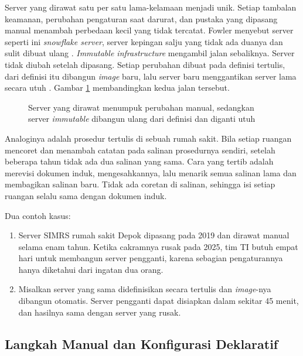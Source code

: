 Server yang dirawat satu per satu lama-kelamaan menjadi unik. Setiap tambalan keamanan,
perubahan pengaturan saat darurat, dan pustaka yang dipasang manual menambah perbedaan kecil
yang tidak tercatat. Fowler menyebut server seperti ini \textit{snowflake server}, server
kepingan salju yang tidak ada duanya dan sulit dibuat ulang \cite{c05-fowler-snowflake}.
\textit{Immutable infrastructure} mengambil jalan sebaliknya. Server tidak diubah setelah
dipasang. Setiap perubahan dibuat pada definisi tertulis, dari definisi itu dibangun
\textit{image} baru, lalu server baru menggantikan server lama secara utuh
\cite{c05-morris-immutable}. Gambar \ref{fig:ch05-immutable} membandingkan kedua jalan
tersebut.

\begin{figure}[!htb]
  \centering
  
  \caption{Server yang dirawat menumpuk perubahan manual, sedangkan server
           \textit{immutable} dibangun ulang dari definisi dan diganti utuh}
  \label{fig:ch05-immutable}
\end{figure}

Analoginya adalah prosedur tertulis di sebuah rumah sakit. Bila setiap ruangan mencoret dan
menambah catatan pada salinan prosedurnya sendiri, setelah beberapa tahun tidak ada dua
salinan yang sama. Cara yang tertib adalah merevisi dokumen induk, mengesahkannya, lalu
menarik semua salinan lama dan membagikan salinan baru. Tidak ada coretan di salinan,
sehingga isi setiap ruangan selalu sama dengan dokumen induk.

Dua contoh kasus:
\begin{enumerate}
  \item Server SIMRS rumah sakit Depok dipasang pada 2019 dan dirawat manual selama enam
        tahun. Ketika cakramnya rusak pada 2025, tim TI butuh empat hari untuk membangun
        server pengganti, karena sebagian pengaturannya hanya diketahui dari ingatan dua
        orang.
  \item Misalkan server yang sama didefinisikan secara tertulis dan \textit{image}-nya
        dibangun otomatis. Server pengganti dapat disiapkan dalam sekitar 45 menit, dan
        hasilnya sama dengan server yang rusak.
\end{enumerate}

\subsection{Langkah Manual dan Konfigurasi Deklaratif}

